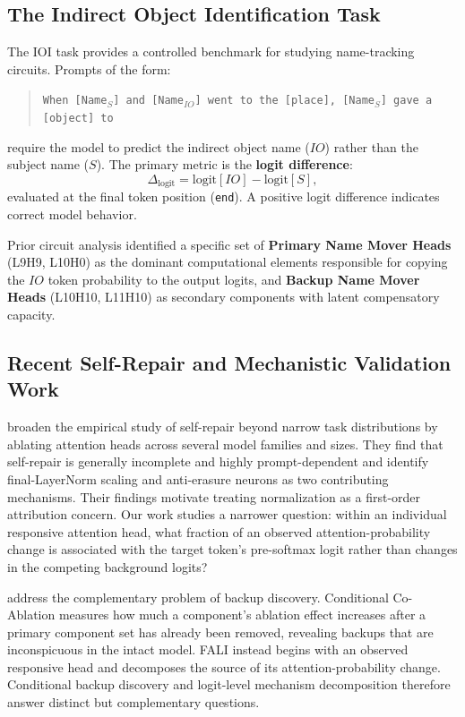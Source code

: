 \documentclass[10pt]{article} %
\begin{document}
\subsection{The Indirect Object Identification Task}
\label{subsec:ioi}

The IOI task \citep{wang2022interpretability} provides a controlled benchmark
for studying name-tracking circuits. Prompts of the form:
\begin{quote}
  \texttt{When [Name$_S$] and [Name$_{IO}$] went to the [place],
  [Name$_S$] gave a [object] to}
\end{quote}
require the model to predict the indirect object name ($IO$) rather than the
subject name ($S$). The primary metric is the \textbf{logit difference}:
\begin{equation}
  \Delta_{\text{logit}} = \text{logit}[IO] - \text{logit}[S],
  \label{eq:logitdiff}
\end{equation}
evaluated at the final token position (\texttt{end}). A positive logit
difference indicates correct model behavior.

Prior circuit analysis \citep{wang2022interpretability} identified a specific
set of \textbf{Primary Name Mover Heads} (L9H9, L10H0) as the dominant
computational elements responsible for copying the $IO$ token probability to
the output logits, and \textbf{Backup Name Mover Heads} (L10H10, L11H10) as
secondary components with latent compensatory capacity.

\subsection{Recent Self-Repair and Mechanistic Validation Work}
\label{subsec:recent_work}

\citet{rushing2024selfrepair} broaden the empirical study of self-repair
beyond narrow task distributions by ablating attention heads across several
model families and sizes. They find that self-repair is generally incomplete
and highly prompt-dependent and identify final-LayerNorm scaling and
anti-erasure neurons as two contributing mechanisms. Their findings motivate
treating normalization as a first-order attribution concern. Our work studies
a narrower question: within an individual responsive attention head, what
fraction of an observed attention-probability change is associated with the
target token's pre-softmax logit rather than changes in the competing
background logits?

\citet{gong2026conditional} address the complementary problem of backup
discovery. Conditional Co-Ablation measures how much a component's ablation
effect increases after a primary component set has already been removed,
revealing backups that are inconspicuous in the intact model. FALI instead
begins with an observed responsive head and decomposes the source of its
attention-probability change. Conditional backup discovery and logit-level
mechanism decomposition therefore answer distinct but complementary questions.
\end{document}
